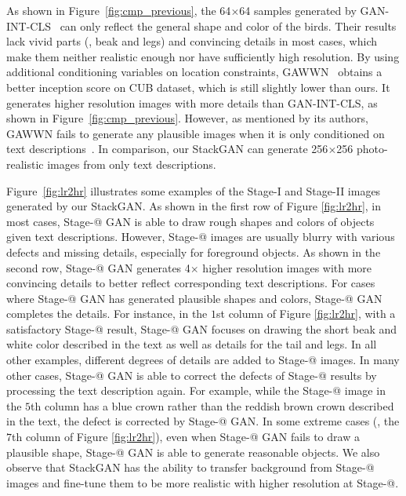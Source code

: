 \documentclass[10pt,twocolumn,letterpaper]{article}
\makeatletter
\newcommand{\Rmnum}[1]{\expandafter\@slowromancap\romannumeral #1@}
\makeatother
\begin{document}
As shown in Figure~\ref{fig:cmp_previous}, the 64$\times$64 samples generated by GAN-INT-CLS~\cite{reed2016generative} can only reflect the general shape and color of the birds. Their results lack vivid parts (\eg, beak and legs) and convincing details in most cases, which make them neither realistic enough nor have sufficiently high resolution. By using additional conditioning variables on location constraints, GAWWN~\cite{reed2016learning} obtains a better inception score on CUB dataset, which is still slightly lower than ours. It generates higher resolution images with more details than GAN-INT-CLS, as shown in Figure~\ref{fig:cmp_previous}. However, as mentioned by its authors, GAWWN fails to generate any plausible images when it is only conditioned on text descriptions~\cite{reed2016learning}. In comparison, our StackGAN can generate 256$\times$256 photo-realistic images from only text descriptions. 


Figure~\ref{fig:lr2hr} illustrates some examples of the Stage-I and Stage-II images generated by our StackGAN. As shown in the first row of Figure \ref{fig:lr2hr}, in most cases, Stage-\Rmnum{1} GAN is able to draw rough shapes and colors of objects given text descriptions. However, Stage-\Rmnum{1} images are usually blurry with various defects and missing details, especially for foreground objects. As shown in the second row, Stage-\Rmnum{2} GAN generates 4$\times$ higher resolution images with more convincing details to better reflect corresponding text descriptions. For cases where Stage-\Rmnum{1} GAN has generated plausible shapes and colors, Stage-\Rmnum{2} GAN completes the details. For instance, in the $1$st column of Figure \ref{fig:lr2hr}, with a satisfactory Stage-\Rmnum{1} result, Stage-\Rmnum{2} GAN focuses on drawing the short beak and white color described in the text as well as details for the tail and legs. In all other examples, different degrees of details are added to Stage-\Rmnum{2} images. In many other cases, Stage-\Rmnum{2} GAN is able to correct the defects of Stage-\Rmnum{1} results by processing the text description again. For example, while the Stage-\Rmnum{1} image in the $5$th column has a blue crown rather than the reddish brown crown described in the text, the defect is corrected by Stage-\Rmnum{2} GAN. In some extreme cases (\eg, the $7$th column of Figure \ref{fig:lr2hr}), even when Stage-\Rmnum{1} GAN fails to draw a plausible shape, Stage-\Rmnum{2} GAN is able to generate reasonable objects. We also observe that StackGAN has the ability to transfer background from Stage-\Rmnum{1} images and fine-tune them to be more realistic with higher resolution at Stage-\Rmnum{2}.
\end{document}

